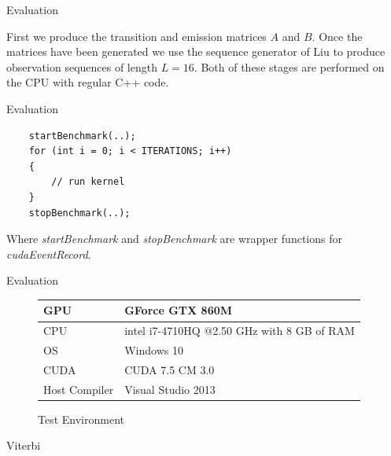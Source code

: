 \documentclass[11pt]{beamer}
\begin{document}
\begin{frame}{Evaluation}

 First we produce the transition and emission matrices $A$ and $B$. 
 Once the matrices have been generated we use the sequence generator of Liu to produce observation sequences of length $L = 16$. Both of these stages are performed on the CPU with regular C++ code.

\end{frame}

\begin{frame}[fragile]{Evaluation}

\begin{verbatim}
	startBenchmark(..);
	for (int i = 0; i < ITERATIONS; i++)
	{
		// run kernel
	}
	stopBenchmark(..);
\end{verbatim}
Where \textit{startBenchmark} and \textit{stopBenchmark} are wrapper functions for \textit{cudaEventRecord}.

\end{frame}

\begin{frame}{Evaluation}
\begin{figure}[H]
\centering
\begin{tabular}{|l|l|}
\hline
GPU &GForce GTX 860M \\ \hline
CPU & intel i7-4710HQ @2.50 GHz with 8 GB of RAM  \\ \hline
OS & Windows 10 \\ \hline
CUDA & CUDA 7.5 CM 3.0 \\ \hline
Host Compiler & Visual Studio 2013 \\ \hline

\end{tabular}

\caption{Test Environment}
\end{figure}
\end{frame}

\begin{frame}[fragile]{Viterbi}
	\begin{verbatim}
	
	\end{verbatim}
\end{frame}
\end{document}
